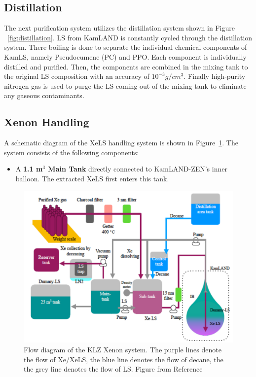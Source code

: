 \subsection{Distillation}
The next purification system utilizes the distillation system shown in Figure ~\ref{fig:distillation}. LS from KamLAND is constantly cycled through the distillation system. There boiling is done to separate the individual chemical components of KamLS, namely Pseudocumene (PC) and PPO. Each component is individually distilled and purified. Then, the components are combined in the mixing tank to the original LS composition with an accuracy of $10^{-3}g/cm^3$. Finally high-purity nitrogen gas is used to purge the LS coming out of the mixing tank to eliminate any gaseous contaminants.

\subsection{Xenon Handling}
A schematic diagram of the XeLS handling system is shown in Figure~\ref{fig:xenonhandling}. The system consists of the following components:
\begin{itemize}
	\item A \textbf{1.1 m$^3$ Main Tank} directly connected to KamLAND-ZEN's inner balloon. The extracted XeLS first enters this tank.
\end{itemize}

\begin{figure}[htb]
	\centering
	\includegraphics[scale=0.5]{xenonhandling.png}
	\caption{Flow diagram of the KLZ Xenon system. The purple lines denote the flow of Xe/XeLS, the blue line denotes the flow of decane, the the grey line denotes the flow of LS. Figure from Reference }
	\label{fig:xenonhandling}
\end{figure}


